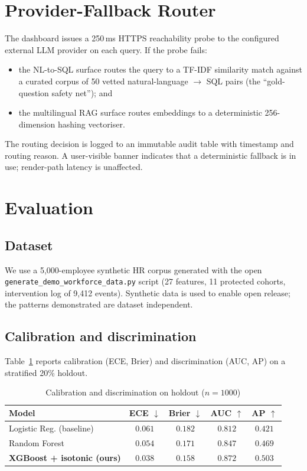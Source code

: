 \documentclass[conference]{IEEEtran}
\begin{document}
\section{Provider-Fallback Router}
\label{sec:fallback}

The dashboard issues a 250\,ms HTTPS reachability probe to the configured
external LLM provider on each query. If the probe fails:

\begin{itemize}
\item the NL-to-SQL surface routes the query to a TF-IDF similarity match
against a curated corpus of 50 vetted natural-language $\to$ SQL pairs (the
``gold-question safety net''); and
\item the multilingual RAG surface routes embeddings to a deterministic
256-dimension hashing vectoriser.
\end{itemize}

The routing decision is logged to an immutable audit table with timestamp
and routing reason. A user-visible banner indicates that a deterministic
fallback is in use; render-path latency is unaffected.

\section{Evaluation}
\label{sec:eval}

\subsection{Dataset}
We use a 5{,}000-employee synthetic HR corpus generated with the open
\texttt{generate\_demo\_workforce\_data.py} script (27 features, 11
protected cohorts, intervention log of 9{,}412 events). Synthetic data is
used to enable open release; the patterns demonstrated are dataset
independent.

\subsection{Calibration and discrimination}
Table~\ref{tab:calib} reports calibration (ECE, Brier) and discrimination
(AUC, AP) on a stratified 20\% holdout.

\begin{table}[!t]
\caption{Calibration and discrimination on holdout ($n=1000$)}
\label{tab:calib}
\centering
\begin{tabular}{lcccc}
\toprule
Model & ECE $\downarrow$ & Brier $\downarrow$ & AUC $\uparrow$ & AP $\uparrow$ \\
\midrule
Logistic Reg. (baseline) & $0.061$ & $0.182$ & $0.812$ & $0.421$ \\
Random Forest             & $0.054$ & $0.171$ & $0.847$ & $0.469$ \\
\textbf{XGBoost + isotonic (ours)} & $\mathbf{0.038}$ & $\mathbf{0.158}$ & $\mathbf{0.872}$ & $\mathbf{0.503}$ \\
\bottomrule
\end{tabular}
\end{table}
\end{document}
